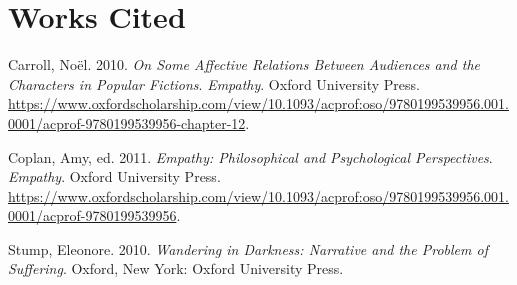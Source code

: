 \documentclass[]{article}
\begin{document}
\hypertarget{works-cited}{%
\section*{Works Cited}\label{works-cited}}

\hypertarget{refs}{}
\leavevmode\hypertarget{ref-carr10}{}%
Carroll, Noël. 2010. \emph{On Some Affective Relations Between Audiences
and the Characters in Popular Fictions}. \emph{Empathy}. Oxford
University Press.
\url{https://www.oxfordscholarship.com/view/10.1093/acprof:oso/9780199539956.001.0001/acprof-9780199539956-chapter-12}.

\leavevmode\hypertarget{ref-copl11b}{}%
Coplan, Amy, ed. 2011. \emph{Empathy: Philosophical and Psychological
Perspectives}. \emph{Empathy}. Oxford University Press.
\url{https://www.oxfordscholarship.com/view/10.1093/acprof:oso/9780199539956.001.0001/acprof-9780199539956}.

\leavevmode\hypertarget{ref-stum10}{}%
Stump, Eleonore. 2010. \emph{Wandering in Darkness: Narrative and the
Problem of Suffering}. Oxford, New York: Oxford University Press.
\end{document}
